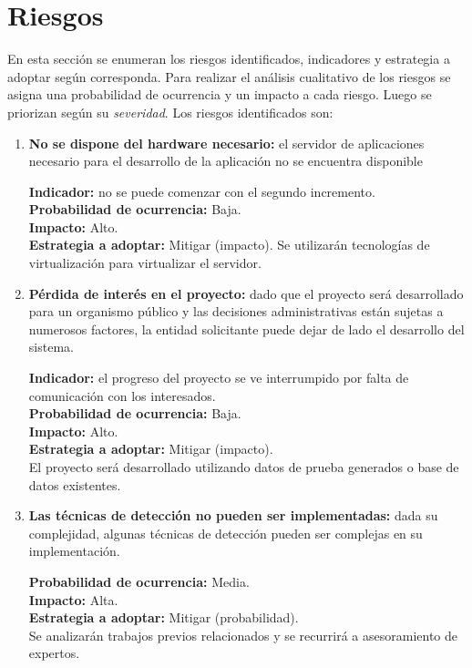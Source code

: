 \section*{Riesgos}

En esta sección se enumeran los riesgos identificados, indicadores y estrategia a adoptar según corresponda. Para realizar el análisis cualitativo de los riesgos se asigna una probabilidad de ocurrencia y un impacto a cada riesgo. Luego se priorizan según su \textit{severidad}. Los riesgos identificados son:

\begin{enumerate}
\item \textbf{No se dispone del hardware necesario:} el servidor de aplicaciones necesario para el desarrollo de la aplicación no se encuentra disponible

\textbf{Indicador:} no se puede comenzar con el segundo incremento. \\
\textbf{Probabilidad de ocurrencia:} Baja. \\
\textbf{Impacto:} Alto. \\
\textbf{Estrategia a adoptar:} Mitigar (impacto).
Se utilizarán tecnologías de virtualización para virtualizar el servidor.

\newpage

\item \textbf{Pérdida de interés en el proyecto:} dado que el proyecto será desarrollado para un organismo público y las decisiones administrativas están sujetas a numerosos factores, la entidad solicitante puede dejar de lado el desarrollo del sistema.

\textbf{Indicador:} el progreso del proyecto se ve interrumpido por falta de comunicación con los interesados. \\
\textbf{Probabilidad de ocurrencia:} Baja. \\
\textbf{Impacto:} Alto. \\
\textbf{Estrategia a adoptar:} Mitigar (impacto). \\
El proyecto será desarrollado utilizando datos de prueba generados o base de datos existentes.

\item \textbf{Las técnicas de detección no pueden ser implementadas:} dada su complejidad, algunas técnicas de detección pueden ser complejas en su implementación.

\textbf{Probabilidad de ocurrencia:} Media. \\
\textbf{Impacto:} Alta. \\
\textbf{Estrategia a adoptar:} Mitigar (probabilidad). \\
Se analizarán trabajos previos relacionados y se recurrirá a asesoramiento de expertos.

\end{enumerate}

